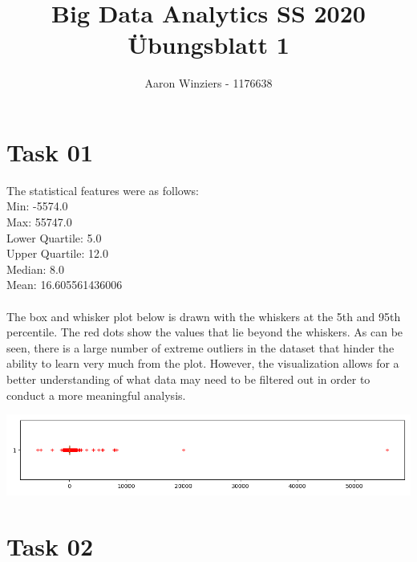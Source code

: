 \documentclass[11pt,a4paper,parskip=half ]{scrartcl}
\author{Aaron Winziers - 1176638}
\title{Big Data Analytics SS 2020\\\LARGE{Übungsblatt 1}}
\begin{document}
	\maketitle
	
\section*{Task 01}
The statistical features were as follows: \\
Min: -5574.0 \\
Max: 55747.0 \\
Lower Quartile: 5.0 \\
Upper Quartile: 12.0 \\
Median: 8.0 \\
Mean: 16.605561436006 \\ ~\\
The box and whisker plot below is drawn with the whiskers at the 5th and 95th percentile. The red dots show the values that lie beyond the whiskers. As can be seen, there is a large number of extreme outliers in the dataset that hinder the ability to learn very much from the plot. However, the visualization allows for a better understanding of what data may need to be filtered out in order to conduct a more meaningful analysis.
\begin{center}
	\includegraphics[width=\textwidth]{Task01.png}
\end{center}

\newpage
\section*{Task 02}
\end{document}

